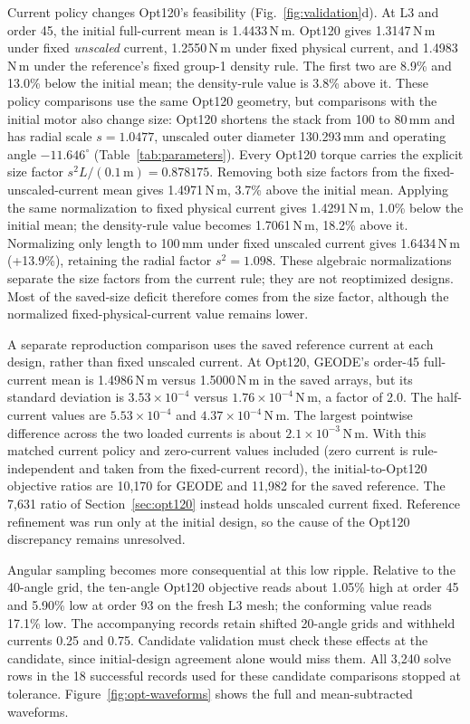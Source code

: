 \documentclass{anvil-paper}
\begin{document}
Current policy changes Opt120's feasibility (Fig.~\ref{fig:validation}d). At L3 and order 45,
the initial full-current mean is 1.4433\,N\,m. Opt120 gives 1.3147\,N\,m
under fixed \emph{unscaled} current, 1.2550\,N\,m under fixed physical
current, and 1.4983\,N\,m under the reference's fixed group-1 density rule.
The first two are 8.9\% and 13.0\% below the initial mean; the density-rule
value is 3.8\% above it. These policy comparisons use the same Opt120
geometry, but comparisons with the initial motor also change size:
Opt120 shortens the stack from 100 to 80\,mm and has radial scale
$s=1.0477$, unscaled outer diameter 130.293\,mm and operating angle
$-11.646^\circ$ (Table~\ref{tab:parameters}). Every Opt120 torque carries
the explicit size factor $s^2L/(0.1\,\mathrm{m})=0.878175$.
Removing both size factors from the fixed-unscaled-current mean gives
1.4971\,N\,m, 3.7\% above the initial mean. Applying the same normalization
to fixed physical current gives 1.4291\,N\,m, 1.0\% below the initial mean;
the density-rule value becomes 1.7061\,N\,m, 18.2\% above it. Normalizing
only length to 100\,mm under fixed unscaled current gives 1.6434\,N\,m
(+13.9\%), retaining the radial factor $s^2=1.098$.
These algebraic normalizations separate the size factors from the current
rule; they are not reoptimized designs. Most of the saved-size deficit
therefore comes from the size factor, although the normalized
fixed-physical-current value remains lower.

A separate reproduction comparison uses the saved reference current at
each design, rather than fixed unscaled current. At Opt120, GEODE's
order-45 full-current mean is 1.4986\,N\,m versus 1.5000\,N\,m in the
saved arrays, but its standard deviation is $3.53\times10^{-4}$ versus
$1.76\times10^{-4}$\,N\,m, a factor of 2.0. The half-current values are
$5.53\times10^{-4}$ and $4.37\times10^{-4}$\,N\,m.
The largest pointwise difference across the two loaded currents is about
$2.1\times10^{-3}$\,N\,m. With this matched current policy and zero-current
values included (zero current is rule-independent and taken from the
fixed-current record), the initial-to-Opt120 objective ratios are 10,170 for
GEODE and 11,982 for the saved reference. The 7,631 ratio of
Section~\ref{sec:opt120} instead holds unscaled current fixed. Reference
refinement was run only at the initial design, so the cause of the Opt120
discrepancy remains unresolved.

Angular sampling becomes more consequential at this low ripple. Relative
to the 40-angle grid, the ten-angle Opt120 objective reads about 1.05\%
high at order 45 and 5.90\% low at order 93 on the fresh L3 mesh; the
conforming value reads 17.1\% low. The accompanying records retain shifted
20-angle grids and withheld currents 0.25 and 0.75. Candidate validation
must check these effects at the candidate, since initial-design agreement
alone would miss them. All 3,240 solve rows in the 18 successful records used for
these candidate comparisons stopped at tolerance.
Figure~\ref{fig:opt-waveforms} shows the full and mean-subtracted waveforms.
\end{document}
